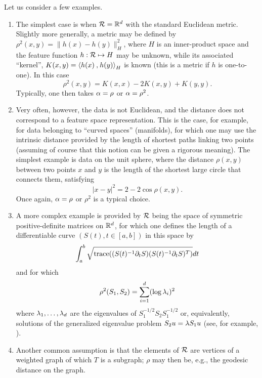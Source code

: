 Let us consider a few examples.
\begin{enumerate}[label=(\roman*), wide=.5cm]
\item The simplest case is when ${\mathcal R} = {\mathbb{R}}^d$ with the standard Euclidean metric.  Slightly more generally, a metric may be defined by $\rho^2(x,y) = \|h(x)-h(y)\|_H^2$, where $H$ is an inner-product space and the feature function $h:{\mathcal R} \mapsto H$ may be unknown, while its associated ``kernel'', $K(x,y) = {\langle {h(x)}\mathbin{,} {h(y)}\rangle}_H$ is known (this is a metric if $h$ is one-to-one). In this case
\[
\rho^2(x,y) = K(x,x) - 2K(x,y) + K(y,y).
\]
Typically, one then takes $\alpha = \rho$ or $\alpha = \rho^2$.
\item
Very often, however, the data is not Euclidean, and the distance does not correspond to a feature space representation. This is the case, for example, for data belonging to ``curved spaces'' (manifolds), for which one may use the intrinsic distance provided by the length of shortest paths linking two points (assuming of course that this notion can be given a rigorous meaning). The simplest example is data on the unit sphere, where the distance $\rho(x,y)$ between two points $x$ and $y$ is the length of the shortest large circle that connects them, satisfying
\[
|x-y|^2 = 2 - 2\cos\rho(x,y).
\]
Once again, $\alpha = \rho$ or $\rho^2$ is a typical choice.
\item
 A more complex example is provided by ${\mathcal R}$ being the space of symmetric positive-definite matrices on ${\mathbb{R}}^d$, for which one defines the length of a differentiable curve $(S(t), t\in[a,b])$ in this space by
 \[
 \int_a^b \sqrt{{\mathrm{trace}}((S(t)^{-1}\partial_t S)(S(t)^{-1}\partial_t S)^T)} dt
 \]
 and for which
 \[
 \rho^2(S_1, S_2) = \sum_{i=1}^d (\log \lambda_i)^2 
 \]
 where $\lambda_1, \ldots, \lambda_d$ are the eigenvalues of $S_1^{-1/2} S_2 S_1^{-1/2}$ or, equivalently, solutions of the generalized eigenvalue problem $S_2 u = \lambda S_1 u$ (see, for example, \cite{fletcher2004principal}). 
  \item Another common assumption is that the elements of ${\mathcal R}$ are vertices of a weighted graph of which $T$ is a subgraph; $\rho$ may then be, e.g., the geodesic distance on the graph.
 \end{enumerate}
 


